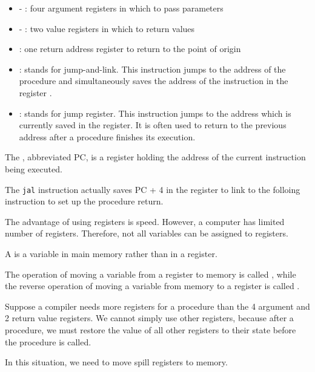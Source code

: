    \begin{itemize}
      \item {} - : four argument registers in which to pass
        parameters
      \item {} - : two value registers in which to return values
      \item {}: one return address register to return to the point of
        origin
    \end{itemize}

    \begin{itemize}
      \item {}: stands for jump-and-link. This instruction jumps to the
        address of the procedure and simultaneously saves the address of the
         instruction in the register .
      \item {}: stands for jump register. This instruction jumps to the
        address which is currently saved in the  register. It is often
        used to return to the previous address after a procedure finishes its
        execution.
    \end{itemize}

    \par The , abbreviated PC, is a register holding the
      address of the current instruction being executed.
    \par The \lstinline{jal} instruction actually saves PC + 4 in the register
       to link to the folloing instruction to set up the procedure
      return.

      \par The advantage of using registers is speed. However, a computer has
        limited number of registers. Therefore, not all variables can be
        assigned to registers.
      \par A  is a variable in main memory rather than in
        a register.
      \par The operation of moving a variable from a register to memory is
        called , while the reverse operation of moving a variable
        from memory to a register is called .

      \par Suppose a compiler needs more registers for a procedure than the
        4 argument and 2 return value registers. We cannot simply use other
        registers, because after a procedure, we must restore the value of all
        other registers to their state before the procedure is called.
      \par In this situation, we need to move spill registers to memory.

